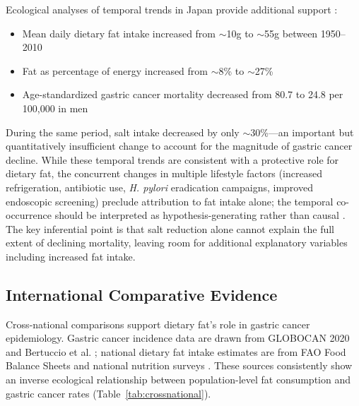 \documentclass[review]{elsarticle}
\begin{document}
Ecological analyses of temporal trends in Japan provide additional support \cite{inoue2005,katanoda2013}:

\begin{itemize}
    \item Mean daily dietary fat intake increased from $\sim$10g to $\sim$55g between 1950--2010
    \item Fat as percentage of energy increased from $\sim$8\% to $\sim$27\%
    \item Age-standardized gastric cancer mortality decreased from 80.7 to 24.8 per 100,000 in men
\end{itemize}

During the same period, salt intake decreased by only $\sim$30\%---an important but quantitatively insufficient change to account for the magnitude of gastric cancer decline. While these temporal trends are consistent with a protective role for dietary fat, the concurrent changes in multiple lifestyle factors (increased refrigeration, antibiotic use, \textit{H. pylori} eradication campaigns, improved endoscopic screening) preclude attribution to fat intake alone; the temporal co-occurrence should be interpreted as hypothesis-generating rather than causal \cite{katanoda2013}. The key inferential point is that salt reduction alone cannot explain the full extent of declining mortality, leaving room for additional explanatory variables including increased fat intake.

\subsection{International Comparative Evidence}

Cross-national comparisons support dietary fat's role in gastric cancer epidemiology. Gastric cancer incidence data are drawn from GLOBOCAN 2020 \cite{sung2021} and Bertuccio et al. \cite{bertuccio2009}; national dietary fat intake estimates are from FAO Food Balance Sheets and national nutrition surveys \cite{mhlw2020}. These sources consistently show an inverse ecological relationship between population-level fat consumption and gastric cancer rates (Table~\ref{tab:crossnational}).
\end{document}

